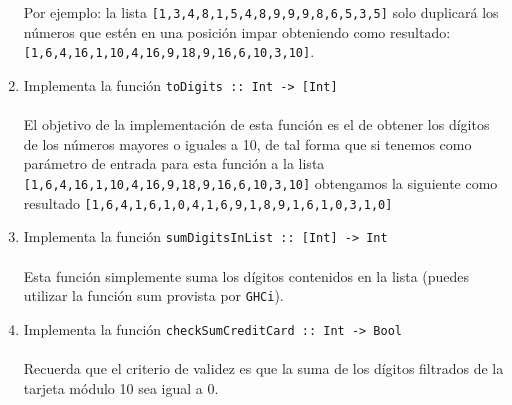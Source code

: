 \begin{exercise}
\begin{enumerate}
                  Por ejemplo: la lista \texttt{[1,3,4,8,1,5,4,8,9,9,9,8,6,5,3,5]} solo duplicará los números que estén en una posición impar obteniendo como resultado: \texttt{[1,6,4,16,1,10,4,16,9,18,9,16,6,10,3,10]}. \\
           \item  Implementa la función \texttt{toDigits :: Int ->\ [Int]}\\\\
                  El objetivo de la implementación de esta función es el de obtener los dígitos de los números mayores o iguales a 10, de tal forma que si tenemos como parámetro de entrada para esta función a la lista \texttt{[1,6,4,16,1,10,4,16,9,18,9,16,6,10,3,10]} obtengamos la siguiente como resultado \texttt{[1,6,4,1,6,1,0,4,1,6,9,1,8,9,1,6,1,0,3,1,0]} \\
           \item  Implementa la función \texttt{sumDigitsInList :: [Int] ->\ Int} \\\\
                  Esta función simplemente suma los dígitos contenidos en la lista (puedes utilizar la función sum provista por \texttt{GHCi}).\\
           \item  Implementa la función \texttt{checkSumCreditCard :: Int ->\ Bool}\\\\
                  Recuerda que el criterio de validez es que la suma de los dígitos filtrados de la tarjeta módulo 10 sea igual a 0.
                    
        \end{enumerate}    
    \end{exercise}

